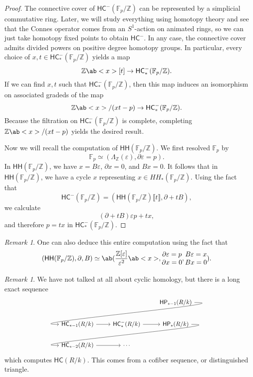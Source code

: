 \documentclass[10pt, oneside]{memoir}
\theoremstyle{definition}
\theoremstyle{remark}
\newtheorem{rmk}[thm]{Remark}
\theoremstyle{plain}
\theoremstyle{definition}
\theoremstyle{remark}
\newcommand{\Z}{\mathbb{Z}}
\newcommand{\F}{\mathbb{F}}
\newcommand{\ep}{\varepsilon}
\newcommand{\ms}[1]{\mathsf{#1}}
\newcommand{\1}{\mathbf{1}}
\newcommand{\2}{\mathbf{2}}
\newcommand{\3}{\mathbf{3}}
\newcommand{\ps}[1]{\llbracket #1 \rrbracket}
\newcommand{\HC}{\ms{HC}}
\newcommand{\HH}{\ms{HH}}
\newcommand{\HP}{\ms{HP}}
\begin{document}
\begin{proof}
    The connective cover of $\HC^-(\F_p/\Z)$ can be represented by a simplicial commutative ring. Later, we will study everything using homotopy theory and see that the Connes operator comes from an $S^1$-action on animated rings, so we can just take homotopy fixed points to obtain $\HC^-$. In any case, the connective cover admits divided powers on positive degree homotopy groups. In particular, every choice of $x,t \in \HC_*^-(\F_p/\Z)$ yields a map
    \[ \Z\ab<x>[t] \to \HC_*^-(\F_p/\Z). \]
    If we can find $x,t$ such that $\HC_*^-(\F_p/\Z)$, then this map induces an isomorphism on associated gradeds of the map
    \[ \Z\ab<x>/(xt-p) \to \HC_*^-(\F_p/\Z). \]
    Because the filtration on $\HC_*^-(\F_p/\Z)$ is complete, completing $\Z\ab<x>/(xt-p)$ yields the desired result.

    Now we will recall the computation of $\HH(\F_p/\Z)$. We first resolved $\F_p$ by
    \[ \F_p \simeq (\Lambda_{\Z}(\ep), \partial \ep = p). \]
    In $\HH(\F_p/\Z)$, we have $x = B \ep$, $\partial x = 0$, and $Bx = 0$. It follows that in $\HH(\F_p/\Z)$, we have a cycle $x$ representing $x \in HH_*(\F_p / \Z)$. Using the fact that
    \[ \HC^-(\F_p/\Z) = (\HH(\F_p/\Z)\ps{t}, \partial + tB),\]
    we calculate
    \[ (\partial + tB) \ep p + tx, \]
    and therefore $p = tx$ in $\HC_*^-(\F_p/\Z)$.
\end{proof}

\begin{rmk}
    One can also deduce this entire computation using the fact that 
    \[ (\HH(\F_p/\Z), \partial, B) \simeq \ab(\frac{\Z[\ep]}{\ep^2} \ab<x>, \Vectorstack{{\partial \ep = p} {\partial x = 0}}, \Vectorstack{{B \ep = x} {Bx = 0}}). \]
\end{rmk}

\begin{rmk}
    We have not talked at all about cyclic homology, but there is a long exact sequence
    \begin{equation*}
    \begin{tikzcd}
        & & \HP_{*-1}(R/k) \arrow[out=0, in=180, looseness=1]{dll} \\
        \HC_{*-1}(R/k) \ar{r} & \HC_*^-(R/k) \ar{r} & \HP_*(R/k) \arrow[out=0,in=180, looseness=1]{dll} \\
        \HC_{*-2}(R/k) \ar{r} & \cdots
    \end{tikzcd}
    \end{equation*}
    which computes $\HC(R/k)$. This comes from a cofiber sequence, or distinguished triangle.
\end{rmk}
\end{document}
